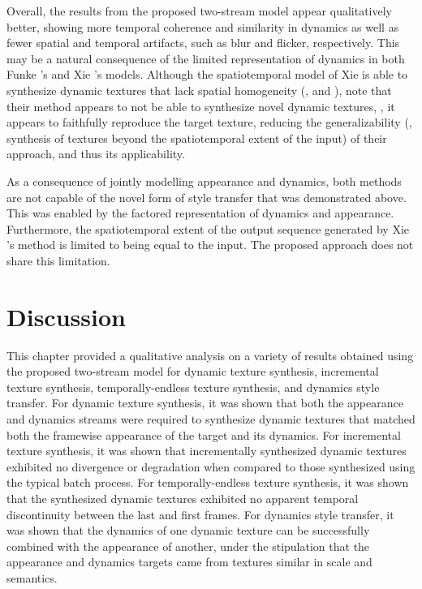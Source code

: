 Overall, the results from the proposed two-stream model appear
qualitatively better, showing more temporal coherence and similarity
in dynamics as well as fewer spatial and temporal artifacts, such as blur and flicker, respectively.
This may be a natural consequence of the limited representation of dynamics
in both Funke \etal's and Xie \etal's models. Although the spatiotemporal model
of Xie \etal \cite{xie2017synthesizing} is able to synthesize dynamic textures
that lack spatial homogeneity (\eg,  and ),
note that their method appears to not be able to synthesize novel dynamic textures, \ie, it
appears to faithfully reproduce the target texture, reducing the generalizability (\eg, synthesis of textures beyond the spatiotemporal extent of the input) of their approach, and thus its applicability.
 
As a consequence of jointly modelling appearance and dynamics, both methods \cite{funke2017,xie2017synthesizing} are not capable of the novel form of style
transfer that was demonstrated above. This was enabled by the factored
representation of dynamics and appearance. Furthermore, the spatiotemporal
extent of the output sequence generated by Xie \etal's
\cite{xie2017synthesizing} method is limited to being equal to the input.
The proposed approach does not share this limitation.

\section{Discussion}

This chapter provided a qualitative analysis on a variety of results obtained using the proposed two-stream model for dynamic texture synthesis, incremental texture synthesis, temporally-endless texture synthesis, and dynamics style transfer. For dynamic texture synthesis, it was shown that both the appearance and dynamics streams were required to synthesize dynamic textures that matched both the framewise appearance of the target and its dynamics. For incremental texture synthesis, it was shown that incrementally synthesized dynamic textures exhibited no divergence or degradation when compared to those synthesized using the typical batch process. For temporally-endless texture synthesis, it was shown that the synthesized dynamic textures exhibited no apparent temporal discontinuity between the last and first frames. For dynamics style transfer, it was shown that the dynamics of one dynamic texture can be successfully combined with the appearance of another, under the stipulation that the appearance and dynamics targets came from textures similar in scale and semantics.


